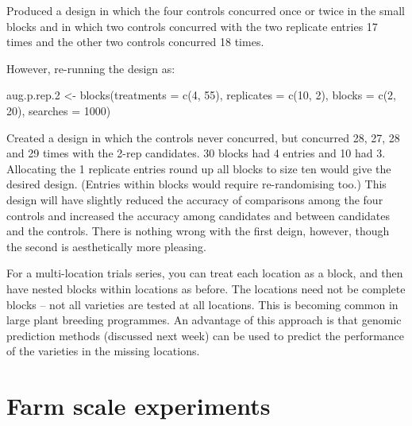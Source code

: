 \documentclass[
]{book}
\makeatletter
\newenvironment{Shaded}{\begin{snugshade}}{\end{snugshade}}
\newcommand{\AttributeTok}[1]{\textcolor[rgb]{0.77,0.63,0.00}{#1}}
\newcommand{\DecValTok}[1]{\textcolor[rgb]{0.00,0.00,0.81}{#1}}
\newcommand{\FloatTok}[1]{\textcolor[rgb]{0.00,0.00,0.81}{#1}}
\newcommand{\FunctionTok}[1]{\textcolor[rgb]{0.00,0.00,0.00}{#1}}
\newcommand{\NormalTok}[1]{#1}
\newcommand{\OtherTok}[1]{\textcolor[rgb]{0.56,0.35,0.01}{#1}}
\newenvironment{kframe}{%
\medskip{}
\setlength{\fboxsep}{.8em}
 \def\at@end@of@kframe{}%
 \ifinner\ifhmode%
  \def\at@end@of@kframe{\end{minipage}}%
  \begin{minipage}{\columnwidth}%
 \fi\fi%
 \def\FrameCommand##1{\hskip\@totalleftmargin \hskip-\fboxsep
 \colorbox{shadecolor}{##1}\hskip-\fboxsep
     \hskip-\linewidth \hskip-\@totalleftmargin \hskip\columnwidth}%
 \MakeFramed {\advance\hsize-\width
   \@totalleftmargin\z@ \linewidth\hsize
   \@setminipage}}%
 {\par\unskip\endMakeFramed%
 \at@end@of@kframe}
\newenvironment{rmdblock}[1]
  {
  \begin{itemize}
  \renewcommand{\labelitemi}{
    \raisebox{-.7\height}[0pt][0pt]{
      {\setkeys{Gin}{width=3em,keepaspectratio}\texttt{[image: images/\#1]}}
    }
  }
  \setlength{\fboxsep}{1em}
  \begin{kframe}
  \item
  }
  {
  \end{kframe}
  \end{itemize}
  }
\newenvironment{rmdnote}
  {\begin{rmdblock}{note}}
  {\end{rmdblock}}
\makeatother
\begin{document}
Produced a design in which the four controls concurred once or twice in the small blocks and in which two controls concurred with the two replicate entries 17 times and the other two controls concurred 18 times.

However, re-running the design as:

\begin{Shaded}
\begin{Highlighting}[]
\NormalTok{aug.p.rep}\FloatTok{.2} \OtherTok{\textless{}{-}} \FunctionTok{blocks}\NormalTok{(}\AttributeTok{treatments =} \FunctionTok{c}\NormalTok{(}\DecValTok{4}\NormalTok{, }\DecValTok{55}\NormalTok{), }\AttributeTok{replicates =} \FunctionTok{c}\NormalTok{(}\DecValTok{10}\NormalTok{, }
    \DecValTok{2}\NormalTok{), }\AttributeTok{blocks =} \FunctionTok{c}\NormalTok{(}\DecValTok{2}\NormalTok{, }\DecValTok{20}\NormalTok{), }\AttributeTok{searches =} \DecValTok{1000}\NormalTok{)}
\end{Highlighting}
\end{Shaded}

Created a design in which the controls never concurred, but concurred 28, 27, 28 and 29 times with the 2-rep candidates. 30 blocks had 4 entries and 10 had 3. Allocating the 1 replicate entries round up all blocks to size ten would give the desired design. (Entries within blocks would require re-randomising too.) This design will have slightly reduced the accuracy of comparisons among the four controls and increased the accuracy among candidates and between candidates and the controls. There is nothing wrong with the first deign, however, though the second is aesthetically more pleasing.

\begin{rmdnote}
For a multi-location trials series, you can treat each location as a block, and then have nested blocks within locations as before. The locations need not be complete blocks -- not all varieties are tested at all locations. This is becoming common in large plant breeding programmes. An advantage of this approach is that genomic prediction methods (discussed next week) can be used to predict the performance of the varieties in the missing locations.
\end{rmdnote}

\hypertarget{farm-scale-experiments}{%
\section{Farm scale experiments}\label{farm-scale-experiments}}
\end{document}
